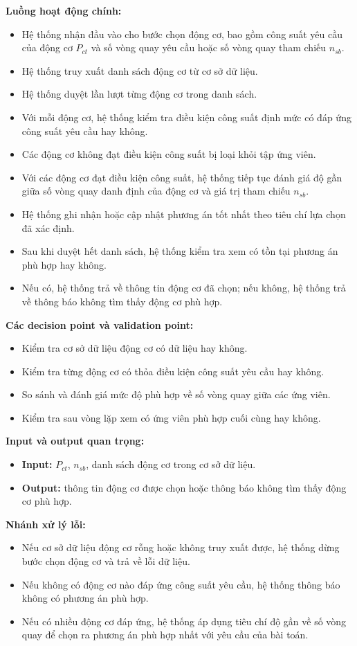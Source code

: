 \documentclass[a4paper]{article}
\begin{document}
\textbf{Luồng hoạt động chính:}
\begin{itemize}
\item Hệ thống nhận đầu vào cho bước chọn động cơ, bao gồm công suất yêu cầu của động cơ \(P_{ct}\) và số vòng quay yêu cầu hoặc số vòng quay tham chiếu \(n_{sb}\).
\item Hệ thống truy xuất danh sách động cơ từ cơ sở dữ liệu.
\item Hệ thống duyệt lần lượt từng động cơ trong danh sách.
\item Với mỗi động cơ, hệ thống kiểm tra điều kiện công suất định mức có đáp ứng công suất yêu cầu hay không.
\item Các động cơ không đạt điều kiện công suất bị loại khỏi tập ứng viên.
\item Với các động cơ đạt điều kiện công suất, hệ thống tiếp tục đánh giá độ gần giữa số vòng quay danh định của động cơ và giá trị tham chiếu \(n_{sb}\).
\item Hệ thống ghi nhận hoặc cập nhật phương án tốt nhất theo tiêu chí lựa chọn đã xác định.
\item Sau khi duyệt hết danh sách, hệ thống kiểm tra xem có tồn tại phương án phù hợp hay không.
\item Nếu có, hệ thống trả về thông tin động cơ đã chọn; nếu không, hệ thống trả về thông báo không tìm thấy động cơ phù hợp.
\end{itemize}

\textbf{Các decision point và validation point:}
\begin{itemize}
\item Kiểm tra cơ sở dữ liệu động cơ có dữ liệu hay không.
\item Kiểm tra từng động cơ có thỏa điều kiện công suất yêu cầu hay không.
\item So sánh và đánh giá mức độ phù hợp về số vòng quay giữa các ứng viên.
\item Kiểm tra sau vòng lặp xem có ứng viên phù hợp cuối cùng hay không.
\end{itemize}

\textbf{Input và output quan trọng:}
\begin{itemize}
\item \textbf{Input:} \(P_{ct}\), \(n_{sb}\), danh sách động cơ trong cơ sở dữ liệu.
\item \textbf{Output:} thông tin động cơ được chọn hoặc thông báo không tìm thấy động cơ phù hợp.
\end{itemize}

\textbf{Nhánh xử lý lỗi:}
\begin{itemize}
\item Nếu cơ sở dữ liệu động cơ rỗng hoặc không truy xuất được, hệ thống dừng bước chọn động cơ và trả về lỗi dữ liệu.
\item Nếu không có động cơ nào đáp ứng công suất yêu cầu, hệ thống thông báo không có phương án phù hợp.
\item Nếu có nhiều động cơ đáp ứng, hệ thống áp dụng tiêu chí độ gần về số vòng quay để chọn ra phương án phù hợp nhất với yêu cầu của bài toán.
\end{itemize}
\end{document}
